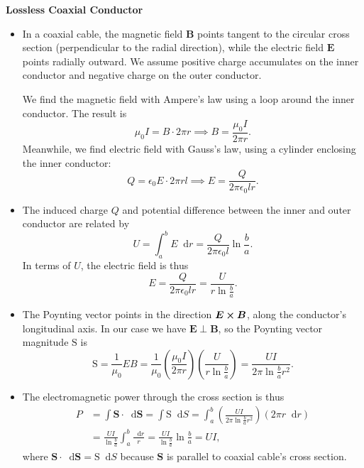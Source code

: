 \documentclass[11pt, a4paper]{article}
\newcommand{\diff}{\mathop{}\!\mathrm{d}} %
\renewcommand{\vec}[1]{\bm{#1}} %
\newcommand{\E}{\vec{E}}  %
\newcommand{\B}{\vec{B}}  %
\renewcommand{\S}{\mathbf{S}}  %
\renewcommand{\SS}{\mathrm{S}}  %
\newcommand{\ee}{\epsilon_{0}}  %
\newcommand{\mm}{\mu_{0}}  %
\newcommand{\m}{\vec{m}}  %
\newcommand{\Poy}{Poynting\xspace}
\begin{document}
\textbf{Lossless Coaxial Conductor}
\begin{itemize}
	\item In a coaxial cable, the magnetic field $ \B $ points tangent to the circular cross section (perpendicular to the radial direction), while the electric field $ \E $ points radially outward. We assume positive charge accumulates on the inner conductor and negative charge on the outer conductor.
	
	We find the magnetic field with Ampere's law using a loop around the inner conductor. The result is
	\begin{equation*}
		\mm I = B \cdot 2\pi r \implies B = \frac{\mm I}{2\pi r}.
	\end{equation*}
	Meanwhile, we find electric field with Gauss's law, using a cylinder enclosing the inner conductor:
	\begin{equation*}
		Q = \ee E \cdot 2\pi r l \implies E = \frac{Q}{2\pi \ee l r}.
	\end{equation*}
	
	
	\item The induced charge $ Q $ and potential difference between the inner and outer conductor are related by
	\begin{equation*}
		U = \int_{a}^{b} E \diff r = \frac{Q}{2\pi \ee l}\ln \frac{b}{a}.
	\end{equation*}
	In terms of $ U $, the electric field is thus
	\begin{equation*}
		E = \frac{Q}{2\pi \ee l r} = \frac{U}{r \ln \frac{b}{a}}.
	\end{equation*}
	
	\item The \Poy vector points in the direction $ \E \cross \B $, along the conductor's longitudinal axis. In our case we have $ \E \perp \B $, so the \Poy vector magnitude $ \SS $ is
	\begin{equation*}
		\SS = \frac{1}{\mm}EB = \frac{1}{\mm} \left (\frac{\mm I}{2\pi r}\right )\left(\frac{U}{r \ln \frac{b}{a}}\right) = \frac{UI}{2 \pi \ln \frac{b}{a}r^{2}}.
	\end{equation*}
	
	\item The electromagnetic power through the cross section is thus
	\begin{align*}
		P &= \int \S \cdot \diff \vec{S} = \int \SS \diff S = \int_{a}^{b}\left(\frac{UI}{2 \pi \ln \frac{b}{a}r^{2}}\right)(2\pi r \diff r)\\
		& = \frac{UI}{\ln \frac{b}{a}} \int_{a}^{b} \frac{\diff r}{r} =	\frac{UI}{\ln \frac{b}{a}}\ln \frac{b}{a} = UI,
	\end{align*}
	where $ \S \cdot \diff \vec{S} = \SS \diff S $ because $ \S $ is parallel to coaxial cable's cross section.
	
\end{itemize}
\end{document}
